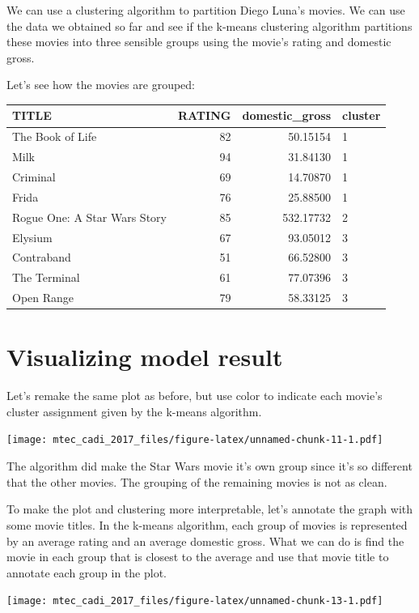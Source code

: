 \documentclass[12pt,]{book}
\theoremstyle{definition}
\theoremstyle{definition}
\theoremstyle{remark}
\begin{document}
We can use a clustering algorithm to partition Diego Luna's movies. We
can use the data we obtained so far and see if the k-means clustering
algorithm partitions these movies into three sensible groups using the
movie's rating and domestic gross.

Let's see how the movies are grouped:

\begin{tabular}{l|r|r|l}
\hline
TITLE & RATING & domestic\_gross & cluster\\
\hline
The Book of Life & 82 & 50.15154 & 1\\
\hline
Milk & 94 & 31.84130 & 1\\
\hline
Criminal & 69 & 14.70870 & 1\\
\hline
Frida & 76 & 25.88500 & 1\\
\hline
Rogue One: A Star Wars Story & 85 & 532.17732 & 2\\
\hline
Elysium & 67 & 93.05012 & 3\\
\hline
Contraband & 51 & 66.52800 & 3\\
\hline
The Terminal & 61 & 77.07396 & 3\\
\hline
Open Range & 79 & 58.33125 & 3\\
\hline
\end{tabular}

\section{Visualizing model result}\label{visualizing-model-result}

Let's remake the same plot as before, but use color to indicate each
movie's cluster assignment given by the k-means algorithm.

\texttt{[image: mtec\_cadi\_2017\_files/figure-latex/unnamed-chunk-11-1.pdf]}

The algorithm did make the Star Wars movie it's own group since it's so
different that the other movies. The grouping of the remaining movies is
not as clean.

To make the plot and clustering more interpretable, let's annotate the
graph with some movie titles. In the k-means algorithm, each group of
movies is represented by an average rating and an average domestic
gross. What we can do is find the movie in each group that is closest to
the average and use that movie title to annotate each group in the plot.

\texttt{[image: mtec\_cadi\_2017\_files/figure-latex/unnamed-chunk-13-1.pdf]}
\end{document}

